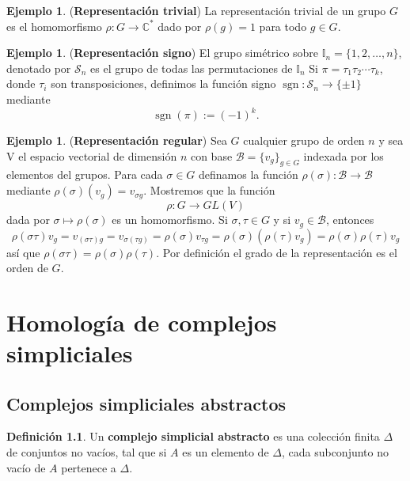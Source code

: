 \documentclass[12pt]{book}
\theoremstyle{definition}
\newtheorem{definition}[theorem]{Definición}
\newtheorem{example}[theorem]{Ejemplo}
\DeclareMathOperator{\sgn}{sgn}
\newcounter{in}
\newcounter{ini}
\begin{document}
{\begin{example}(\textbf{Representación trivial})
  La representación trivial de un grupo $G$ es el homomorfismo
  $\rho:G\rightarrow \mathbb{C^{*}}$ dado por $\rho(g)=1$ para todo
  $g\in G$.
\end{example}

\begin{example}(\textbf{Representación signo})
  El grupo simétrico sobre $\mathbb{I}_{n}=\{1,2,\ldots,n\}$, denotado
  por $\mathcal{S}_{n}$ es el grupo de todas las permutaciones de $\mathbb{I}_{n}$ 
  Si $\pi=\tau_{1}\tau_{2}\cdots\tau_{k}$, donde $\tau_{i}$ son
  transposiciones, definimos la función signo
  $\sgn:\mathcal{S}_{n} \rightarrow\{\pm1\}$ mediante $$\sgn(\pi):=(-1)^{k}.$$
\end{example}

\begin{example}(\textbf{Representación regular})
  Sea $G$ cualquier grupo de orden $n$ y sea V el espacio vectorial de
  dimensión $n$ con base $\mathcal{B}=\{v_{g}\}_{g\in G}$ indexada por
  los elementos del grupos. Para cada $\sigma\in G$ definamos la función
  $\rho(\sigma):\mathcal{B}\rightarrow \mathcal{B}$ mediante $\rho(\sigma)(v_{g})=v_{\sigma g}$.
  Mostremos que la función $$\rho:G\rightarrow GL(V)$$ dada por
  $\sigma\mapsto\rho(\sigma)$ es un homomorfismo. Si $\sigma,\tau \in G$
  y si $v_{g}\in \mathcal{B}$, entonces $$\rho(\sigma
  \tau)v_{g}=v_{(\sigma\tau)g}=v_{\sigma(\tau g)}=\rho(\sigma)v_{\tau
    g}=\rho(\sigma)(\rho(\tau)v_{g})=\rho(\sigma)\rho(\tau)v_{g} $$
  así que $\rho(\sigma\tau)=\rho(\sigma)\rho(\tau)$. Por definición el 
  grado de la representación es el orden de $G$.

\end{example}

\chapter{Homología de complejos simpliciales}

\section{Complejos simpliciales abstractos}

\begin{definition}
Un \textbf{complejo simplicial abstracto} es una colección finita
$\Delta$ de conjuntos no vacíos, tal que si $A$ es un elemento de $\Delta$,
cada subconjunto no vacío de $A$ pertenece a $\Delta$.
\end{definition}

}
\end{document}

